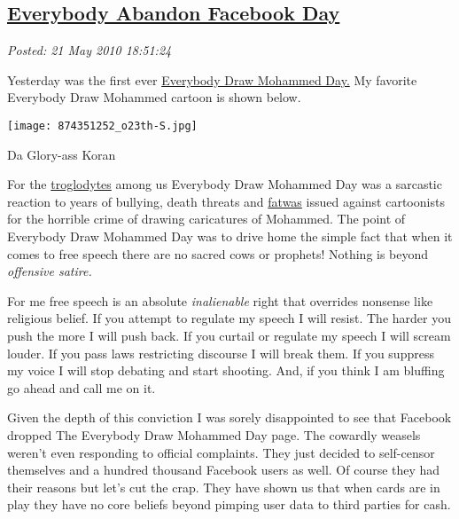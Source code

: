 %

\subsection*{\href{https://bakerjd99.wordpress.com/2010/05/21/everybody-abandon-facebook-day/}{Everybody Abandon Facebook Day}}


\noindent\emph{Posted: 21 May 2010 18:51:24}
\vspace{6pt}

Yesterday was the first ever
\href{http://www.foxnews.com/scitech/2010/05/19/facebook-fracas-breaks-everybody-draw-mohammad-day/\#}{Everybody
Draw Mohammed Day.} My favorite Everybody Draw Mohammed cartoon is shown
below.

\captionsetup[figure]{labelformat=empty}
\begin{floatingfigure}[r]{0.30\textwidth}
\centering
\texttt{[image: 874351252\_o23th-S.jpg]}
\caption{Da Glory-ass  Koran}
\label{fig:521X0}
\end{floatingfigure} For the \href{http://en.wikipedia.org/wiki/Troglodyte}{troglodytes}
among us Everybody Draw Mohammed Day was a sarcastic reaction to years
of bullying, death threats and
\href{http://islam.about.com/od/law/g/fatwa.htm}{fatwas} issued against
cartoonists for the horrible crime of drawing caricatures of Mohammed.
The point of Everybody Draw Mohammed Day was to drive home the simple
fact that when it comes to free speech there are no sacred cows or
prophets! Nothing is beyond \emph{offensive satire.}

For me free speech is an absolute \emph{inalienable} right that
overrides nonsense like religious belief. If you attempt to regulate my
speech I will resist. The harder you push the more I will push back. If
you curtail or regulate my speech I will scream louder. If you pass laws
restricting discourse I will break them. If you suppress my voice I will
stop debating and start shooting. And, if you think I am bluffing go
ahead and call me on it.

Given the depth of this conviction I was sorely disappointed to see that
Facebook dropped The Everybody Draw Mohammed Day page. The cowardly
weasels weren't even responding to official complaints. They just
decided to self-censor themselves and a hundred thousand Facebook users
as well. Of course they had their reasons but let's cut the crap. They
have shown us that when cards are in play they have no core beliefs
beyond pimping user data to third parties for cash.


